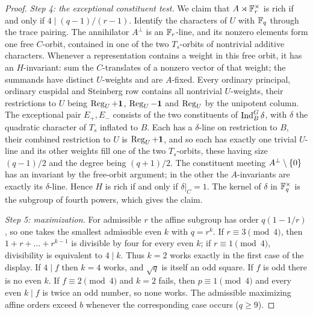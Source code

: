\begin{proof}
\emph{Step 4: the exceptional constituent test.} We claim that
$A\rtimes\mathbb{F}_r^\times$ is rich if and only if $4\mid(q-1)/(r-1)$. Identify the
characters of $U$ with $\mathbb{F}_q$ through the trace pairing. The annihilator
$A^\perp$ is an $\mathbb{F}_r$-line, and its nonzero elements form one free
$C$-orbit, contained in one of the two $T_s$-orbits of nontrivial additive
characters. Whenever a representation contains a weight in this free orbit,
it has an $H$-invariant: sum the $C$-translates of a nonzero vector of that
weight; the summands have distinct $U$-weights and are $A$-fixed. Every
ordinary principal, ordinary cuspidal and Steinberg row contains all
nontrivial $U$-weights, their restrictions to $U$ being $\operatorname{Reg}_U+\mathbf{1}$,
$\operatorname{Reg}_U-\mathbf{1}$ and $\operatorname{Reg}_U$ by the unipotent column. The exceptional pair
$E_+,E_-$ consists of the two constituents of $\operatorname{Ind}_B^G\delta$, with $\delta$
the quadratic character of $T_s$ inflated to $B$. Each has a $\delta$-line on
restriction to $B$, their combined restriction to $U$ is $\operatorname{Reg}_U+\mathbf{1}$, and so
each has exactly one trivial $U$-line and its other weights fill one of the
two $T_s$-orbits, these having size $(q-1)/2$ and the degree being $(q+1)/2$.
The constituent meeting $A^\perp\setminus\{0\}$ has an invariant by the
free-orbit argument; in the other the $A$-invariants are exactly its
$\delta$-line. Hence $H$ is rich if and only if $\delta|_C=1$. The kernel of
$\delta$ in $\mathbb{F}_q^\times$ is the subgroup of fourth powers, which gives the
claim.

\emph{Step 5: maximization.} For admissible $r$ the affine subgroup has order
$q(1-1/r)$, so one takes the smallest admissible even $k$ with $q=r^k$. If
$r\equiv3\pmod4$, then $1+r+\dots+r^{k-1}$ is divisible by four for every even
$k$; if $r\equiv1\pmod4$, divisibility is equivalent to $4\mid k$. Thus $k=2$
works exactly in the first case of the display. If $4\mid f$ then $k=4$
works, and $\sqrt q$ is itself an odd square. If $f$ is odd there is no even
$k$. If $f\equiv2\pmod4$ and $k=2$ fails, then $p\equiv1\pmod4$ and every even
$k\mid f$ is twice an odd number, so none works. The admissible maximizing
affine orders exceed $b$ whenever the corresponding case occurs ($q\ge9$).


\end{proof}
